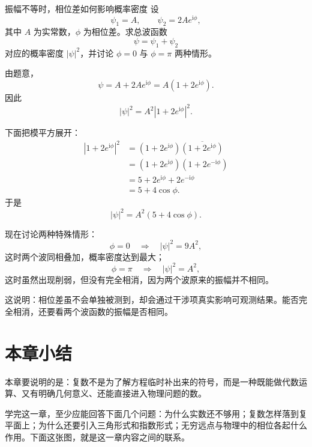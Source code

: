 \begin{lizi}{振幅不等时，相位差如何影响概率密度}{}
设
\[
\psi_1=A,\qquad \psi_2=2Ae^{\mathrm{i}\phi},
\]
其中 $A$ 为实常数，$\phi$ 为相位差。求总波函数
\[
\psi=\psi_1+\psi_2
\]
对应的概率密度 $|\psi|^2$，并讨论 $\phi=0$ 与 $\phi=\pi$ 两种情形。

\begin{jie}
由题意，
\[
\psi=A+2Ae^{\mathrm{i}\phi}=A(1+2e^{\mathrm{i}\phi}).
\]
因此
\[
|\psi|^2=A^2|1+2e^{\mathrm{i}\phi}|^2.
\]

下面把模平方展开：
\[
\begin{aligned}
|1+2e^{\mathrm{i}\phi}|^2
&=(1+2e^{\mathrm{i}\phi})\overline{(1+2e^{\mathrm{i}\phi})}\\
&=(1+2e^{\mathrm{i}\phi})(1+2e^{-\mathrm{i}\phi})\\
&=5+2e^{\mathrm{i}\phi}+2e^{-\mathrm{i}\phi}\\
&=5+4\cos\phi.
\end{aligned}
\]
于是
\[
|\psi|^2=A^2(5+4\cos\phi).
\]

现在讨论两种特殊情形：
\[
\phi=0 \quad \Longrightarrow \quad |\psi|^2=9A^2,
\]
这时两个波同相叠加，概率密度达到最大；
\[
\phi=\pi \quad \Longrightarrow \quad |\psi|^2=A^2,
\]
这时虽然出现削弱，但没有完全相消，因为两个波原来的振幅并不相同。

这说明：相位差虽不会单独被测到，却会通过干涉项真实影响可观测结果。能否完全相消，还要看两个波函数的振幅是否相同。
\end{jie}
\end{lizi}

\section{本章小结}

\begin{tishi}[本章一句话回看]
本章要说明的是：复数不是为了解方程临时补出来的符号，而是一种既能做代数运算、又有明确几何意义、还能直接进入物理问题的数。
\end{tishi}

学完这一章，至少应能回答下面几个问题：为什么实数还不够用；复数怎样落到复平面上；为什么还要引入三角形式和指数形式；无穷远点与物理中的相位各起什么作用。下面这张图，就是这一章内容之间的联系。

